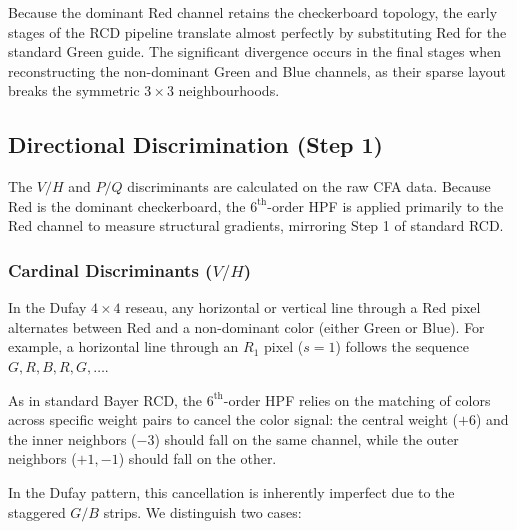 \documentclass[a4paper,11pt]{article}
\begin{document}
Because the dominant Red channel retains the checkerboard topology, the early stages of the RCD pipeline translate almost perfectly by substituting Red for the standard Green guide. The significant divergence occurs in the final stages when reconstructing the non-dominant Green and Blue channels, as their sparse layout breaks the symmetric $3\times3$ neighbourhoods.

\subsection{Directional Discrimination (Step 1)}
The $V/H$ and $P/Q$ discriminants are calculated on the raw CFA data. Because Red is the dominant checkerboard, the $6^{\text{th}}$-order HPF is applied primarily to the Red channel to measure structural gradients, mirroring Step 1 of standard RCD.

\subsubsection{Cardinal Discriminants ($V/H$)}
In the Dufay $4\times4$ reseau, any horizontal or vertical line through a Red pixel alternates between Red and a non-dominant color (either Green or Blue). For example, a horizontal line through an $R_1$ pixel ($s=1$) follows the sequence $G, R, B, R, G, \dots$. 

As in standard Bayer RCD, the $6^{\text{th}}$-order HPF relies on the matching of colors across specific weight pairs to cancel the color signal: the central weight ($+6$) and the inner neighbors ($-3$) should fall on the same channel, while the outer neighbors ($+1, -1$) should fall on the other. 

In the Dufay pattern, this cancellation is inherently imperfect due to the staggered $G/B$ strips. We distinguish two cases:
\end{document}
